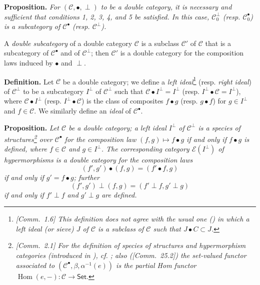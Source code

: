\documentclass{article}
\newenvironment{itenv}[1]
  {\phantomsection\par\medskip\noindent\textbf{#1.}\itshape}
  {\par\medskip}
\newenvironment{rmenv}[1]
  {\phantomsection\par\medskip\noindent\textbf{#1.}\rmfamily}
  {\par\medskip}
\newcommand{\oldpage}[1]{\marginpar{\footnotesize$\Big\vert$ \textit{p.~#1}}}
\newcommand{\CC}{\mathcal{C}}
\begin{document}
\begin{itenv}{Proposition}
  For $(\CC,\bullet,\perp)$ to be a double category, it is necessary and sufficient that conditions 1, 2, 3\textquotesingle, 4\textquotesingle, and 5 be satisfied.
  In this case, $\CC_0^\perp$ (resp. $\CC_0^\bullet$) is a subcategory of $\CC^\bullet$ (resp. $\CC^\perp$).
\end{itenv}

A \emph{double subcategory} of a double category $\CC$ is a subclass $\CC'$ of $\CC$ that is a subcategory of $\CC^\bullet$ and of $\CC^\perp$;
then $\CC'$ is a double category for the composition laws induced by $\bullet$ and $\perp$.

\begin{rmenv}{Definition}
  Let $\CC$ be a double category;
  we define a \emph{left ideal}\footnote{\emph{[Comm.~1.6] This definition does not agree with the usual one (\cite{73,122}) in which a left ideal (or \emph{sieve}) $J$ of $\CC$ is a subclass of $\CC$ such that $J\bullet C\subset J$.}} (resp. \emph{right ideal}) of $\CC^\perp$ to be a subcategory $I^\perp$ of $\CC^\perp$ such that $\CC\bullet I^\perp=I^\perp$ (resp. $I^\perp\bullet\CC=I^\perp$), where $\CC\bullet I^\perp$ (resp. $I^\perp\bullet\CC$) is the class of composites $f\bullet g$ (resp. $g\bullet f$) for $g\in I^\perp$ and $f\in\CC$.
  We similarly define an \emph{ideal} of $\CC^\bullet$.
\end{rmenv}

\oldpage{1199}

\begin{itenv}{Proposition}
  Let $\CC$ be a double category;
  a left ideal $I^\perp$ of $\CC^\perp$ is a species of structures\footnote{\emph{[Comm.~2.1] For the definition of species of structures and hypermorphism categories (introduced in \cite{47a}), cf. \cite[\S~I, 2--3]{63}; also ([Comm.~25.2]) the set-valued functor associated to $(\CC^\bullet,\beta,\alpha^{-1}(e))$ is the partial Hom functor $\operatorname{Hom}(e,-)\colon\CC\to\mathsf{Set}$}.} \cite{47b,55} over $\CC^\bullet$ for the composition law $(f,g)\mapsto f\bullet g$ if and only if $f\bullet g$ is defined, where $f\in\CC$ and $g\in I^\perp$.
  The corresponding category $\mathscr{E}(I^\perp)$ of hypermorphisms \cite{47b,55} is a double category for the composition laws
  \[
    (f',g')\bullet(f,g)
    = (f'\bullet f,g)
  \]
  if and only if $g'=f\bullet g$; further
  \[
    (f',g')\perp(f,g)
    = (f'\perp f,g'\perp g)
  \]
  if and only if $f'\perp f$ and $g'\perp g$ are defined.
\end{itenv}
\end{document}

